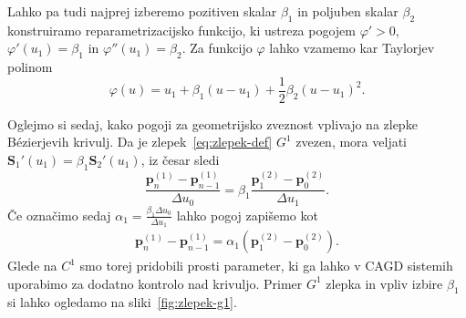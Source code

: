 \documentclass[isrm2, tisk]{fmfdelo}
\newcommand{\p}{\mathbf{p}}
\begin{document}
    Lahko pa tudi najprej izberemo pozitiven skalar $\beta_1$ in poljuben skalar $\beta_2$ konstruiramo reparametrizacijsko funkcijo, ki ustreza pogojem $\varphi'>0$,  $\varphi'(u_1)=\beta_1$ in $\varphi''(u_1)=\beta_2$.
    Za funkcijo $\varphi$ lahko vzamemo kar Taylorjev polinom
    \[\varphi(u) = u_1 + \beta_1(u-u_1) + \frac{1}{2}\beta_2(u-u_1)^2.\]

    Oglejmo si sedaj, kako pogoji za geometrijsko zveznost vplivajo na zlepke Bézierjevih krivulj.
    Da je zlepek~\eqref{eq:zlepek-def} $G^1$ zvezen, mora veljati  $\mathbf{S}_1'(u_1) = \beta_1\mathbf{S}_2'(u_1)$, iz česar sledi
    \[\frac{\p_{n}^{(1)} - \p_{n-1}^{(1)}}{\Delta u_0} = \beta_1\frac{\p_{1}^{(2)} - \p_{0}^{(2)}}{\Delta u_1}.\]
    Če označimo sedaj $\alpha_1=  \frac{\beta_1\Delta u_0}{\Delta u_1}$ lahko pogoj zapišemo kot
    \begin{align}
        \p_{n}^{(1)} - \p_{n-1}^{(1)}= \alpha_1(\p_{1}^{(2)} - \p_{0}^{(2)}).\label{eq:g1-pogoj}
    \end{align}
    Glede na $C^1$  smo torej pridobili prosti parameter, ki ga lahko v CAGD sistemih uporabimo za dodatno kontrolo nad krivuljo.
    Primer $G^1$ zlepka in vpliv izbire $\beta_1$ si lahko ogledamo na sliki~\ref{fig:zlepek-g1}.
\end{document}
